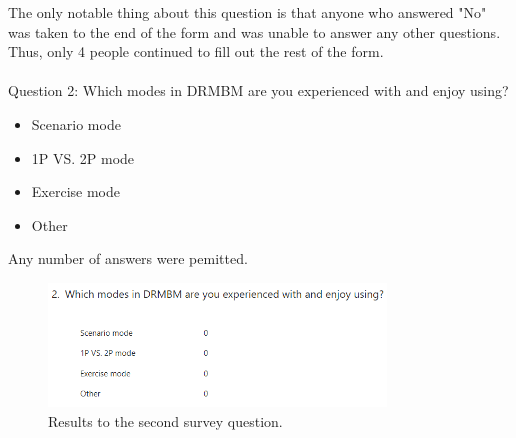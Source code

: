 \documentclass{article}
\begin{document}
The only notable thing about this question is that anyone who answered "No" was taken to the end of the form and was unable to answer any other questions. Thus, only 4 people continued to fill out the rest of the form.
\\\\
Question 2: Which modes in DRMBM are you experienced with and enjoy using?
\begin{itemize}
    \renewcommand\labelitemi{--}
    \item Scenario mode
    \item 1P VS. 2P mode
    \item Exercise mode
    \item Other
\end{itemize}
Any number of answers were pemitted.

\begin{figure}[h]
    \centering
    \includegraphics[width=0.8\textwidth]{survey2.png}
    \caption{\label{fig:survey2}Results to the second survey question.}
\end{figure}
\end{document}
